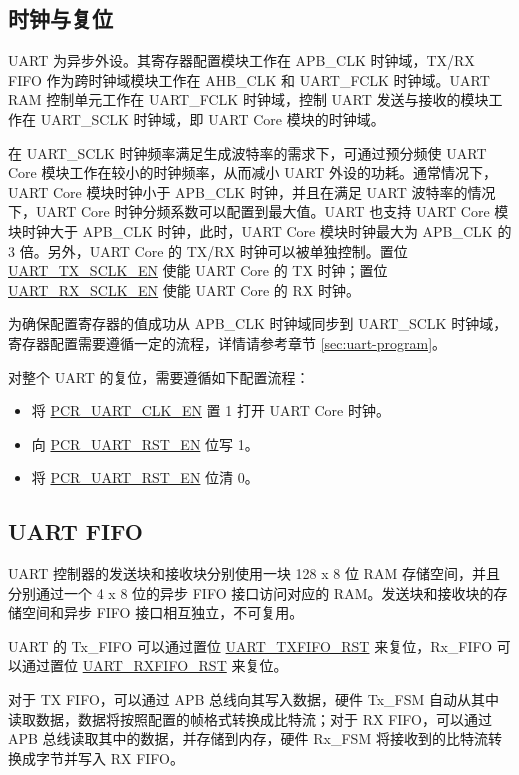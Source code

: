 \documentclass[main\_\_CN.tex]{subfiles}
\begin{document}
\subsection{时钟与复位}
UART 为异步外设。其寄存器配置模块工作在 APB\_CLK 时钟域，TX/RX FIFO 作为跨时钟域模块工作在 AHB\_CLK 和 UART\_FCLK 时钟域。UART RAM 控制单元工作在 UART\_FCLK 时钟域，控制 UART 发送与接收的模块工作在 UART\_SCLK 时钟域，即 UART Core 模块的时钟域。

在 UART\_SCLK 时钟频率满足生成波特率的需求下，可通过预分频使 UART Core 模块工作在较小的时钟频率，从而减小 UART 外设的功耗。通常情况下，UART Core 模块时钟小于 APB\_CLK 时钟，并且在满足 UART 波特率的情况下，UART Core 时钟分频系数可以配置到最大值。UART 也支持 UART Core 模块时钟大于 APB\_CLK 时钟，此时，UART Core 模块时钟最大为 APB\_CLK 的 3 倍。另外，UART Core 的 TX/RX 时钟可以被单独控制。置位 \hyperref[fielddesc:UARTTXSCLKEN]{UART\_TX\_SCLK\_EN} 使能 UART Core 的 TX 时钟；置位 \hyperref[fielddesc:UARTRXSCLKEN]{UART\_RX\_SCLK\_EN} 使能 UART Core 的 RX 时钟。

为确保配置寄存器的值成功从 APB\_CLK 时钟域同步到 UART\_SCLK 时钟域，寄存器配置需要遵循一定的流程，详情请参考章节 \ref{sec:uart-program}。

对整个 UART 的复位，需要遵循如下配置流程：
\begin{itemize}
    \item 将 \hyperref[fielddesc:PCRUART0CLKEN]{PCR\_UART\_CLK\_EN} 置 1 打开 UART Core 时钟。
    \item 向 \hyperref[fielddesc:PCRUART0RSTEN]{PCR\_UART\_RST\_EN} 位写 1。
    \item 将 \hyperref[fielddesc:PCRUART0RSTEN]{PCR\_UART\_RST\_EN} 位清 0。
\end{itemize}


\subsection{UART FIFO}


UART 控制器的发送块和接收块分别使用一块 128 x 8 位 RAM 存储空间，并且分别通过一个 4 x 8 位的异步 FIFO 接口访问对应的 RAM。发送块和接收块的存储空间和异步 FIFO 接口相互独立，不可复用。

UART 的 Tx\_FIFO 可以通过置位 \hyperref[fielddesc:UARTTXFIFORST]{UART\_TXFIFO\_RST} 来复位，Rx\_FIFO 可以通过置位 \hyperref[fielddesc:UARTRXFIFORST]{UART\_RXFIFO\_RST} 来复位。

对于 TX FIFO，可以通过 APB 总线向其写入数据，硬件 Tx\_FSM 自动从其中读取数据，数据将按照配置的帧格式转换成比特流；对于 RX FIFO，可以通过 APB 总线读取其中的数据，并存储到内存，硬件 Rx\_FSM 将接收到的比特流转换成字节并写入 RX FIFO。
\end{document}
